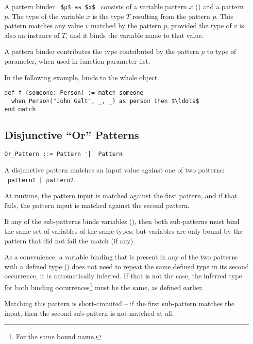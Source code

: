 A pattern binder ~\lstinline!$p$ as $x$!~ consists of a variable pattern $x$ () and a pattern $p$. The type of the variable $x$ is the type $T$ resulting from the pattern $p$. This pattern matches any value $v$ matched by the pattern $p$, provided the type of $v$ is also an instance of $T$, and it binds the variable name to that value. 

A pattern binder contributes the type contributed by the pattern $p$ to type of parameter, when used in function parameter list. 

\example In the following example,  binds to the whole  object. 
\begin{lstlisting}
def f (someone: Person) := match someone
  when Person("John Galt", _, _) as person then $\ldots$
end match
\end{lstlisting}





\subsection{Disjunctive ``Or'' Patterns}
\label{sec:disjunctive-patterns}

\grammar\begin{lstlisting}
Or_Pattern ::= Pattern '|' Pattern
\end{lstlisting}

A disjunctive pattern matches an input value against one of two patterns: ~\lstinline!pattern1 | pattern2!. 

At runtime, the pattern input is matched against the first pattern, and if that fails, the pattern input is matched against the second pattern. 

If any of the sub-patterns binds variables (), then both sub-patterns must bind the same set of variables of the same types, but variables are only bound by the pattern that did not fail the match (if any). 

As a convenience, a variable binding that is present in any of the two patterns with a defined type () does not need to repeat the same defined type in its second occurrence, it is automatically inferred. If that is not the case, the inferred type for both binding occurrences\footnote{For the same bound name.} must be the same, as defined earlier. 

Matching this pattern is short-circuited -- if the first sub-pattern matches the input, then the second sub-pattern is not matched at all. 

